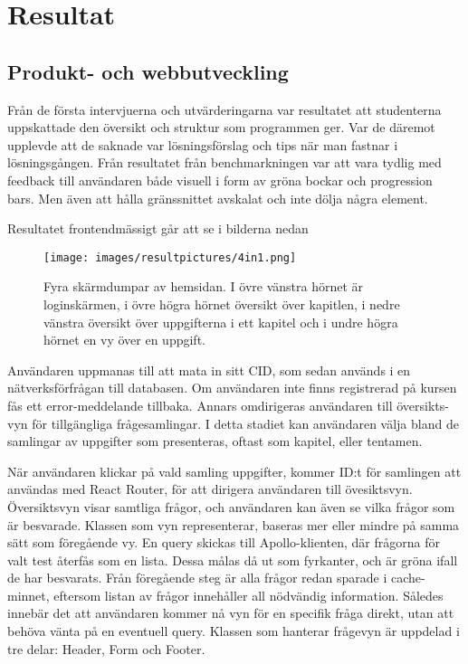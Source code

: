 \chapter{Resultat}

\section{Produkt- och webbutveckling}
Från de första intervjuerna och utvärderingarna var resultatet att studenterna uppskattade den översikt och struktur som programmen ger. Var de däremot upplevde att de saknade var lösningsförslag och tips när man fastnar i lösningsgången. Från resultatet från benchmarkningen var att vara tydlig med feedback till användaren både visuell i form av gröna bockar och progression bars. Men även att hålla gränssnittet avskalat och inte dölja några element. 

Resultatet frontendmässigt går att se i bilderna nedan

\begin{center}
\begin{figure}[h]
    \centering
    \texttt{[image: images/resultpictures/4in1.png]}
    \caption{Fyra skärmdumpar av hemsidan. I övre vänstra hörnet är loginskärmen, i övre högra hörnet översikt över kapitlen, i nedre vänstra översikt över uppgifterna i ett kapitel och i undre högra hörnet en vy över en uppgift. }
    \label{raket}
\end{figure}
\end{center}


Användaren uppmanas till att mata in sitt CID, som sedan används i en nätverksförfrågan till databasen. Om användaren inte finns registrerad på kursen fås ett error-meddelande tillbaka. Annars omdirigeras användaren till översikts-vyn för tillgängliga frågesamlingar. I detta stadiet kan användaren välja bland de samlingar av uppgifter som presenteras, oftast som kapitel, eller tentamen. 

När användaren klickar på vald samling uppgifter, kommer ID:t för samlingen att användas med React Router, för att dirigera användaren till övesiktsvyn. Översiktsvyn visar samtliga frågor, och användaren kan även se vilka frågor som är besvarade. Klassen som vyn representerar, baseras mer eller mindre på samma sätt som föregående vy. En query skickas till Apollo-klienten, där frågorna för valt test återfås som en lista. Dessa målas då ut som fyrkanter, och är gröna ifall de har besvarats. Från föregående steg är alla frågor redan sparade i cache-minnet, eftersom listan av frågor innehåller all nödvändig information. Således innebär det att användaren kommer nå vyn för en specifik fråga direkt, utan att behöva vänta på en eventuell query. Klassen som hanterar frågevyn är uppdelad i tre delar: Header, Form och Footer. 


